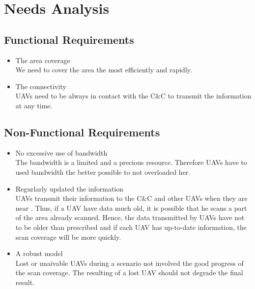 \chapter{Needs Analysis}

\section{Functional Requirements}

\begin{itemize}

\item The area coverage\\
We need to cover the area the most efficiently and rapidly.

\item The connectivity\\
UAVs need to be always in contact with the C\&C to transmit the information at any time.



\end{itemize}

\section{Non-Functional Requirements}

\begin{itemize}

\item No excessive use of bandwidth\\
The bandwidth is a limited and a precious resource. Therefore UAVs have to used bandwidth the better possible to not overloaded her.

\item Regurlarly updated the information\\
UAVs transmit their information to the C\&C and other UAVs when they are near . Thus, if a UAV have data much old, it is possible that he scans a part of the area already scanned. Hence, the data transmitted by UAVs have not to be older than prescribed and if each UAV has up-to-date information, the scan coverage will be more quickly.

\item A robust model\\
Lost or unaivable UAVs during a scenario not involved the good progress of the scan coverage. The resulting of a lost UAV should not degrade the final result.

\end{itemize}
